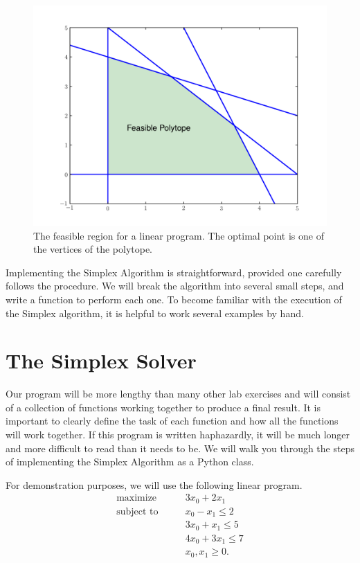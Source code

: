 \begin{figure}
\centering
\includegraphics[width=\textwidth]{feasiblePolytope.pdf}
\caption{The feasible region for a linear program. The optimal point
is one of the vertices of the polytope.}
\label{fig:polytope}
\end{figure}

Implementing the Simplex Algorithm is straightforward, provided one carefully follows the procedure.
We will break the algorithm into several small steps, and write a function to perform each one.
To become familiar with the execution of the Simplex algorithm, it is helpful to work several examples by hand.

\section*{The Simplex Solver}
Our program will be more lengthy than many other lab exercises and will consist of a collection of functions working
together to produce a final result.
It is important to clearly define the task of each function and how all the functions will work together.
If this program is written haphazardly, it will be much longer and more difficult to read than it needs to be.
We will walk you through the steps of implementing the Simplex Algorithm as a Python class.

For demonstration purposes, we will use the following linear program.
\begin{align*}
\text{maximize}\qquad & 3x_0 + 2x_1 \\
\text{subject to}\qquad
& x_0 - x_1 \leq 2 \\
& 3x_0 + x_1 \leq 5 \\
& 4x_0 + 3x_1 \leq 7 \\
& x_0, x_1 \geq 0.
\end{align*}

